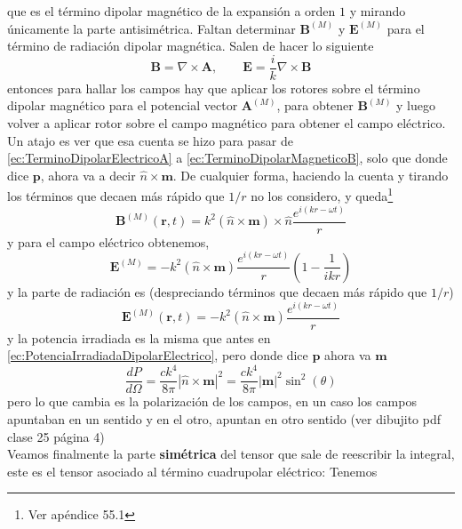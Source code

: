 que es el término dipolar magnético de la expansión a orden $1$ y mirando únicamente la parte antisimétrica. Faltan determinar $\textbf{B}^{(M)}$ y $\textbf{E}^{(M)}$ para el término de radiación dipolar magnética. Salen de hacer lo siguiente
\begin{equation*}
    \textbf{B} = \nabla \times \textbf{A},
    \quad
    \quad
    \textbf{E} = \frac{i}{k} \nabla \times \textbf{B}
\end{equation*}
entonces para hallar los campos hay que aplicar los rotores sobre el término dipolar magnético para el potencial vector $\textbf{A}^{(M)}$, para obtener $\textbf{B}^{(M)}$ y luego volver a aplicar rotor sobre el campo magnético para obtener el campo eléctrico. Un atajo es ver que esa cuenta se hizo para pasar de  \eqref{ec:TerminoDipolarElectricoA} a \eqref{ec:TerminoDipolarMagneticoB}, solo que donde dice $\textbf{p}$, ahora va a decir $\hat{n}\times \textbf{m}$. De cualquier forma, haciendo la cuenta y tirando los términos que decaen más rápido que $1/r$ no los considero, y queda\footnote{Ver apéndice 55.1}
\begin{equation*}
    \textbf{B}^{(M)}(\textbf{r},t) 
    = k^{2} (\hat{n} \times \textbf{m}) \times \hat{n}
    \frac{e^{i(kr - \omega t)}}{r}
\end{equation*}
y para el campo eléctrico obtenemos,
\begin{equation*}
    \textbf{E}^{(M)} 
    = -k^{2}(\hat{n}\times \textbf{m})
    \frac{e^{i(kr - \omega t)}}{r}
    \left(
        1 - \frac{1}{ikr}
    \right)
\end{equation*}
y la parte de radiación es (despreciando términos que decaen más rápido que $1/r$)
\begin{equation*}
    \textbf{E}^{(M)}(\textbf{r},t)
    = -k^{2}(\hat{n} \times \textbf{m})
    \frac{e^{i(kr - \omega t)}}{r}
\end{equation*}
y la potencia irradiada es la misma que antes en \eqref{ec:PotenciaIrradiadaDipolarElectrico}, pero donde dice $\textbf{p}$ ahora va $\textbf{m}$
\begin{equation*}
    \frac{dP}{d\Omega}
    = \frac{ck^{4}}{8\pi}|\hat{n}\times \textbf{m}|^{2}
    = \frac{ck^{4}}{8\pi}|\textbf{m}|^{2}\sin^{2}{(\theta)}
\end{equation*}
pero lo que cambia es la polarización de los campos, en un caso los campos apuntaban en un sentido y en el otro, apuntan en otro sentido (ver dibujito pdf clase 25 página 4)\\
\indent Veamos finalmente la parte \textbf{simétrica} del tensor que sale de reescribir la integral, este es el tensor asociado al término cuadrupolar eléctrico: Tenemos
